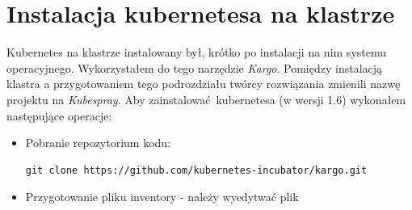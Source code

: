 \documentclass[10pt,a4paper,titlepage,twoside]{report}
\begin{document}
\section{Instalacja kubernetesa na klastrze}
Kubernetes na klastrze instalowany był, krótko po instalacji na nim systemu operacyjnego. Wykorzystałem do tego narzędzie \textit{Kargo}. Pomiędzy instalacją klastra a przygotowaniem tego podrozdziału twórcy rozwiązania zmienili nazwę projektu na \textit{Kubespray}. Aby zainstalować kubernetesa (w wersji 1.6) wykonałem następujące operacje:
\begin{itemize}
\item Pobranie repozytorium kodu:
\begin{lstlisting}[breaklines=true]
git clone https://github.com/kubernetes-incubator/kargo.git
\end{lstlisting}
\item Przygotowanie pliku inventory - należy wyedytwać plik 
\end{itemize}

\listoffigures
{}

\newpage

\listoftables
{}
\end{document}
